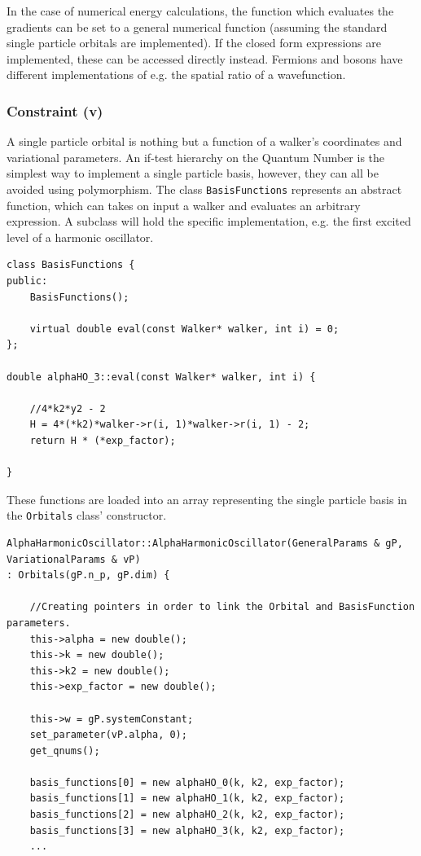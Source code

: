 In the case of numerical energy calculations, the function which evaluates the gradients can be set to a general numerical function (assuming the standard single particle orbitals are implemented). If the closed form expressions are implemented, these can be accessed directly instead. Fermions and bosons have different implementations of e.g. the spatial ratio of a wavefunction.


\subsubsection{Constraint (v)}

A single particle orbital is nothing but a function of a walker's coordinates and variational parameters.  An if-test hierarchy on the Quantum Number is the simplest way to implement a single particle basis, however, they can all be avoided using polymorphism. The class \verb+BasisFunctions+ represents an abstract function, which can takes on input a walker and evaluates an arbitrary expression. A subclass will hold the specific implementation, e.g. the first excited level of a harmonic oscillator.

\vspace{0.5cm}
\begin{lstlisting}
class BasisFunctions {
public:
    BasisFunctions();
    
    virtual double eval(const Walker* walker, int i) = 0;
};

double alphaHO_3::eval(const Walker* walker, int i) {
    
    //4*k2*y2 - 2
    H = 4*(*k2)*walker->r(i, 1)*walker->r(i, 1) - 2;
    return H * (*exp_factor);
    
}
\end{lstlisting}

These functions are loaded into an array representing the single particle basis in the \verb+Orbitals+ class' constructor.

\vspace{0.5cm}
\begin{lstlisting}
AlphaHarmonicOscillator::AlphaHarmonicOscillator(GeneralParams & gP, VariationalParams & vP)
: Orbitals(gP.n_p, gP.dim) {

    //Creating pointers in order to link the Orbital and BasisFunction parameters.
    this->alpha = new double();
    this->k = new double();
    this->k2 = new double();
    this->exp_factor = new double();

    this->w = gP.systemConstant;
    set_parameter(vP.alpha, 0);
    get_qnums();

    basis_functions[0] = new alphaHO_0(k, k2, exp_factor);
    basis_functions[1] = new alphaHO_1(k, k2, exp_factor);
    basis_functions[2] = new alphaHO_2(k, k2, exp_factor);
    basis_functions[3] = new alphaHO_3(k, k2, exp_factor);
    ...
    
\end{lstlisting}

